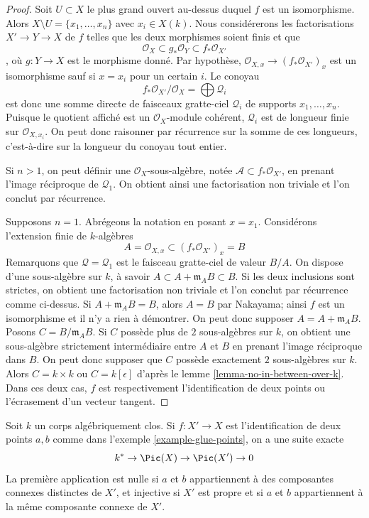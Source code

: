 \begin{proof}
Soit $U \subset X$ le plus grand ouvert au-dessus duquel $f$ est un isomorphisme. Alors $X \setminus U = \{x_1, \ldots, x_n\}$ avec $x_i \in X(k)$. Nous considérerons les factorisations $X' \to Y \to X$ de $f$ telles que les deux morphismes soient finis et que $$
\mathcal{O}_X \subset g_*\mathcal{O}_Y \subset f_*\mathcal{O}_{X'}
$$, où $g : Y \to X$ est le morphisme donné. Par hypothèse, $\mathcal{O}_{X, x} \to (f_*\mathcal{O}_{X'})_x$ est un isomorphisme sauf si $x = x_i$ pour un certain $i$. Le conoyau $$
f_*\mathcal{O}_{X'}/\mathcal{O}_X = \bigoplus \mathcal{Q}_i
$$ est donc une somme directe de faisceaux gratte-ciel $\mathcal{Q}_i$ de supports $x_1, \ldots, x_n$. Puisque le quotient affiché est un $\mathcal{O}_X$-module cohérent, $\mathcal{Q}_i$ est de longueur finie sur $\mathcal{O}_{X, x_i}$. On peut donc raisonner par récurrence sur la somme de ces longueurs, c'est-à-dire sur la longueur du conoyau tout entier.

\medskip\noindent
Si $n > 1$, on peut définir une $\mathcal{O}_X$-sous-algèbre, notée $\mathcal{A} \subset f_*\mathcal{O}_{X'}$, en prenant l'image réciproque de $\mathcal{Q}_1$. On obtient ainsi une factorisation non triviale et l'on conclut par récurrence.

\medskip\noindent
Supposons $n = 1$. Abrégeons la notation en posant $x = x_1$. Considérons l'extension finie de $k$-algèbres $$
A = \mathcal{O}_{X, x} \subset (f_*\mathcal{O}_{X'})_x = B
$$ Remarquons que $\mathcal{Q} = \mathcal{Q}_1$ est le faisceau gratte-ciel de valeur $B/A$. On dispose d'une sous-algèbre sur $k$, à savoir $A \subset A + \mathfrak m_A B \subset B$. Si les deux inclusions sont strictes, on obtient une factorisation non triviale et l'on conclut par récurrence comme ci-dessus. Si $A + \mathfrak m_A B = B$, alors $A = B$ par Nakayama; ainsi $f$ est un isomorphisme et il n'y a rien à démontrer. On peut donc supposer $A = A + \mathfrak m_A B$. Posons $C = B/\mathfrak m_A B$. Si $C$ possède plus de $2$ sous-algèbres sur $k$, on obtient une sous-algèbre strictement intermédiaire entre $A$ et $B$ en prenant l'image réciproque dans $B$. On peut donc supposer que $C$ possède exactement $2$ sous-algèbres sur $k$. Alors $C = k \times k$ ou $C = k[\epsilon]$ d'après le lemme \ref{lemma-no-in-between-over-k}. Dans ces deux cas, $f$ est respectivement l'identification de deux points ou l'écrasement d'un vecteur tangent.
\end{proof}

\begin{lemma}
\label{lemma-glue-points}
Soit $k$ un corps algébriquement clos. Si $f : X' \to X$ est l'identification de deux points $a, b$ comme dans l'exemple \ref{example-glue-points}, on a une suite exacte $$
k^* \to \Pic(X) \to \Pic(X') \to 0
$$ La première application est nulle si $a$ et $b$ appartiennent à des composantes connexes distinctes de $X'$, et injective si $X'$ est propre et si $a$ et $b$ appartiennent à la même composante connexe de $X'$.
\end{lemma}

